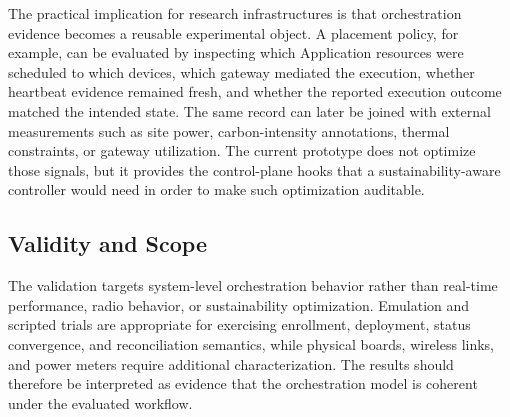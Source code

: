\begingroup
\color{red}
The practical implication for research infrastructures is that orchestration evidence becomes a reusable experimental object. A placement policy, for example, can be evaluated by inspecting which Application resources were scheduled to which devices, which gateway mediated the execution, whether heartbeat evidence remained fresh, and whether the reported execution outcome matched the intended state. The same record can later be joined with external measurements such as site power, carbon-intensity annotations, thermal constraints, or gateway utilization. The current prototype does not optimize those signals, but it provides the control-plane hooks that a sustainability-aware controller would need in order to make such optimization auditable.


\endgroup

\subsection{Validity and Scope}
The validation targets system-level orchestration behavior rather than real-time performance, radio behavior, or sustainability optimization. Emulation and scripted trials are appropriate for exercising enrollment, deployment, status convergence, and reconciliation semantics, while physical boards, wireless links, and power meters require additional characterization. The results should therefore be interpreted as evidence that the orchestration model is coherent under the evaluated workflow.

